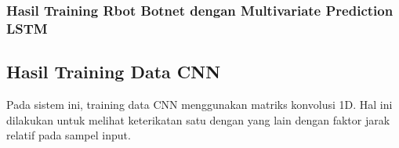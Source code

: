 \documentclass[./skripsi.tex]{subfiles}
\begin{document}
\subsubsection{Hasil Training Rbot Botnet dengan Multivariate Prediction LSTM}
\label{rbot2_loss}

\label{rbot2_acc}

\subsection{Hasil Training Data CNN}
\par Pada sistem ini, training data CNN menggunakan matriks konvolusi 1D. Hal ini dilakukan untuk melihat keterikatan satu dengan yang lain dengan faktor jarak relatif pada sampel input.
\end{document}

